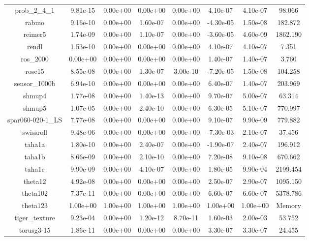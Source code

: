 {{\begin{table}[h]
\begin{center}
{\begin{tabular}{cccccccc}
      prob\_2\_4\_1 & 9.81e-15 & 0.00e+00 & 0.00e+00 & 0.00e+00 &
      4.10e-07 & 4.10e-07 & 98.066\\
      rabmo & 9.16e-10 & 0.00e+00 & 1.60e-07 & 0.00e+00 &
      -4.30e-05 & 1.50e-08 & 182.872\\
      reimer5 & 1.74e-09 & 0.00e+00 & 1.10e-07 & 0.00e+00 &
      -3.60e-05 & 4.60e-09 & 1862.190\\
      rendl & 1.53e-10 & 0.00e+00 & 0.00e+00 & 0.00e+00 &
      4.10e-07 & 4.10e-07 & 7.351\\
      ros\_2000 & 0.00e+00 & 0.00e+00 & 0.00e+00 & 0.00e+00 &
      1.40e-07 & 1.40e-07 & 3.760\\
      rose15 & 8.55e-08 & 0.00e+00 & 1.30e-07 & 3.00e-10 &
      -7.20e-05 & 1.50e-08 & 104.258\\
      sensor\_1000b & 6.94e-10 & 0.00e+00 & 0.00e+00 & 0.00e+00 &
      6.40e-07 & 1.40e-07 & 203.969\\
      shmup4 & 1.77e-08 & 0.00e+00 & 1.40e-13 & 0.00e+00 &
      9.70e-07 & 5.00e-07 & 63.314\\
      shmup5 & 1.07e-05 & 0.00e+00 & 2.40e-10 & 0.00e+00 &
      6.30e-05 & 5.10e-07 & 770.997\\
      spar060-020-1\_LS & 7.77e-08 & 0.00e+00 & 0.00e+00 &
      0.00e+00 & 9.10e-07 & 9.90e-09 & 779.882\\
      swissroll & 9.48e-06 & 0.00e+00 & 0.00e+00 & 0.00e+00 &
      -7.30e-03 & 2.10e-07 & 37.456\\
      taha1a & 1.80e-10 & 0.00e+00 & 2.40e-07 & 0.00e+00 &
      -1.90e-07 & 2.40e-07 & 196.912\\
      taha1b & 8.66e-09 & 0.00e+00 & 2.10e-10 & 0.00e+00 &
      7.20e-08 & 9.10e-08 & 670.662\\
      taha1c & 9.90e-09 & 0.00e+00 & 4.10e-07 & 0.00e+00 &
      1.80e-05 & 9.90e-04 & 2199.454\\
      theta12 & 4.92e-08 & 0.00e+00 & 0.00e+00 & 0.00e+00 &
      2.50e-07 & 2.90e-07 & 1095.150\\
      theta102 & 7.37e-11 & 0.00e+00 & 0.00e+00 & 0.00e+00 &
      6.60e-07 & 6.60e-07 & 5378.786\\
      theta123 & 1.00e+00 & 1.00e+00 & 1.00e+00 & 1.00e+00 &
      1.00e+00 & 1.00e+00 & Memory\\
      tiger\_texture & 9.23e-04 & 0.00e+00 & 1.20e-12 &
      8.70e-11 & 1.60e-03 & 2.00e-03 & 53.752\\
      torusg3-15 & 1.86e-11 & 0.00e+00 & 0.00e+00 & 0.00e+00 &
      3.30e-07 & 3.30e-07 & 24.455\\

\end{tabular}}
\end{center}
\end{table}}}
